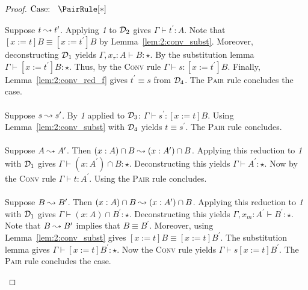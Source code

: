 \begin{proof}
    $\text{Case: }\begin{array}{c} \PairRule[*] \end{array}$
    \begin{proofcase}
        Suppose $t \leadsto t^\prime$.
        Applying \textit{1} to $\mathcal{D}_{2}$ gives $\Gamma \vdash t^\prime : A$.
        Note that $[x := t]B \equiv [x := t^\prime]B$ by Lemma~\ref{lem:2:conv_subst}.
        Moreover, deconstructing $\mathcal{D}_{1}$ yields $\Gamma, x_\tau : A \vdash B : \star$.
        By the substitution lemma $\Gamma \vdash [x := t^\prime]B : \star$.
        Thus, by the \textsc{Conv} rule $\Gamma \vdash s : [x := t^\prime]B$.
        Finally, Lemma~\ref{lem:2:conv_red_f} gives $t^\prime \equiv s$ from $\mathcal{D}_{4}$.
        The \textsc{Pair} rule concludes the case.
        \\ \\
        Suppose $s \leadsto s^\prime$.
        By \textit{1} applied to $\mathcal{D}_{3}$: $\Gamma \vdash s^\prime : [x := t]B$.
        Using Lemma~\ref{lem:2:conv_subst} with $\mathcal{D}_{4}$ yields $t \equiv s^\prime$.
        The \textsc{Pair} rule concludes.
        \\ \\
        Suppose $A \leadsto A^\prime$.
        Then $(x : A) \cap B \leadsto (x : A^\prime) \cap B$.
        Applying this reduction to \textit{1} with $\mathcal{D}_{1}$ gives $\Gamma \vdash (x : A^\prime) \cap B : \star$.
        Deconstructing this yields $\Gamma \vdash A^\prime : \star$.
        Now by the \textsc{Conv} rule $\Gamma \vdash t : A^\prime$.
        Using the \textsc{Pair} rule concludes.
        \\ \\
        Suppose $B \leadsto B^\prime$.
        Then $(x : A) \cap B \leadsto (x : A^\prime) \cap B$.
        Applying this reduction to \textit{1} with $\mathcal{D}_{1}$ gives $\Gamma \vdash (x : A) \cap B^\prime : \star$.
        Deconstructing this yields $\Gamma, x_m : A^\prime \vdash B^\prime : \star$.
        Note that $B \leadsto B^\prime$ implies that $B \equiv B^\prime$.
        Moreover, using Lemma~\ref{lem:2:conv_subst} gives $[x := t]B \equiv [x := t]B^\prime$.
        The substitution lemma gives $\Gamma \vdash [x := t]B^\prime : \star$.
        Now the \textsc{Conv} rule yields $\Gamma \vdash s [x := t]B^\prime$.
        The \textsc{Pair} rule concludes the case.
    \end{proofcase}


\end{proof}
